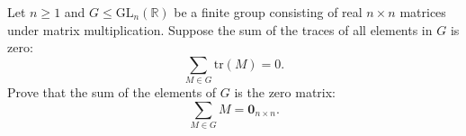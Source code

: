 \begin{problem}
    Let \( n \geq 1 \) and \( G \leq \mathrm{GL}_n\left(\mathbb{R}\right) \) be a finite group consisting of real \( n \times n \) matrices under matrix multiplication. Suppose the sum of the traces of all elements in \( G \) is zero:
    \[
        \sum_{M \in G} \mathrm{tr}\left(M\right) = 0.
    \]
    Prove that the sum of the elements of \( G \) is the zero matrix:
    \[
        \sum_{M \in G} M = \mathbf{0}_{n \times n}.
    \]
\end{problem}
